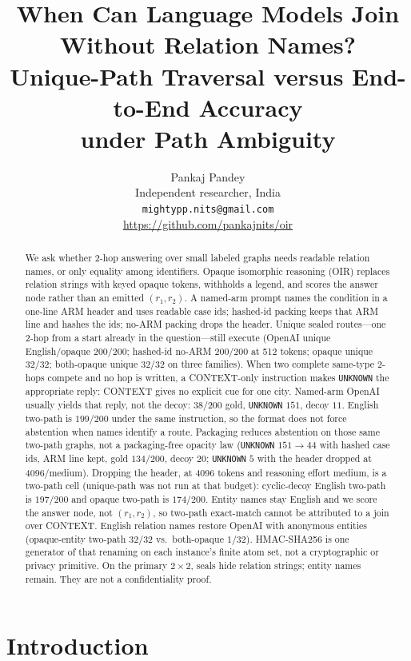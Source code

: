 \documentclass{article}
\title{When Can Language Models Join\\
Without Relation Names?\\
Unique-Path Traversal versus End-to-End Accuracy\\
under Path Ambiguity}
\author{%
  Pankaj Pandey \\
  Independent researcher, India \\
  \mbox{\texttt{mightypp.nits@gmail.com}} \\
  \url{https://github.com/pankajnits/oir}
}
\begin{document}
\maketitle

\begin{abstract}
We ask whether 2-hop answering over small labeled graphs needs readable
relation names, or only equality among identifiers.
Opaque isomorphic reasoning (OIR) replaces relation strings with keyed
opaque tokens, withholds a legend, and scores the answer node rather than
an emitted $(r_1,r_2)$.
A named-arm prompt names the condition in a one-line ARM header and uses
readable case ids; hashed-id packing keeps that ARM line and hashes the
ids; no-ARM packing drops the header.
Unique sealed routes---one 2-hop from a start already in the
question---still execute
(OpenAI unique English/opaque $200/200$;
hashed-id no-ARM $200/200$ at 512 tokens;
opaque unique $32/32$;
both-opaque unique $32/32$ on three families).
When two complete same-type 2-hops compete and no hop is written, a
CONTEXT-only instruction makes \texttt{UNKNOWN} the appropriate reply:
CONTEXT gives no explicit cue for one city.
Named-arm OpenAI usually yields that reply, not the decoy: $38/200$ gold,
\texttt{UNKNOWN} $151$, decoy $11$.
English two-path is $199/200$ under the same instruction, so the format
does not force abstention when names identify a route.
Packaging reduces abstention on those same two-path graphs, not a
packaging-free opacity law
(\texttt{UNKNOWN} $151\to 44$ with hashed case ids, ARM line kept,
gold $134/200$, decoy $20$;
\texttt{UNKNOWN} $5$ with the header dropped at 4096/medium).
Dropping the header, at 4096 tokens and reasoning effort medium, is a
two-path cell (unique-path was not run at that budget):
cyclic-decoy English two-path is $197/200$ and opaque two-path is
$174/200$.
Entity names stay English and we score the answer node, not $(r_1,r_2)$,
so two-path exact-match cannot be attributed to a join over CONTEXT.
English relation names restore OpenAI with anonymous entities
(opaque-entity two-path $32/32$ vs.\ both-opaque $1/32$).
HMAC-SHA256 is one generator of that renaming on each instance's finite
atom set, not a cryptographic or privacy primitive.
On the primary $2{\times}2$, seals hide relation strings; entity names
remain. They are not a confidentiality proof.
\end{abstract}

\section{Introduction}
\end{document}
